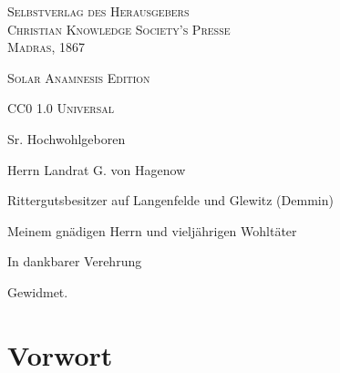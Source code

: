 \documentclass{article}
\begin{document}
\begin{titlepage}
	\vspace{1\baselineskip}

        {\scshape\small Selbstverlag des Herausgebers\\Christian Knowledge Society's Presse\\\normalsize Madras, 1867}
		
	\vspace{0.25\baselineskip} %

        {\scshape\small Solar Anamnesis Edition}%
    
	{\scshape\footnotesize CC0 1.0 Universal} %
\end{titlepage}
\clearpage
\tableofcontents
\clearpage
\vspace*{\fill}
\begin{center}
Sr. Hochwohlgeboren

\bigskip

Herrn Landrat G. von Hagenow

Rittergutsbesitzer auf Langenfelde und Glewitz (Demmin)

\bigskip

Meinem gnädigen Herrn und vieljährigen Wohltäter

\bigskip

In dankbarer Verehrung

\bigskip

Gewidmet.
\end{center}
\vspace*{\fill}
\clearpage
\section*{Vorwort}
\end{document}
